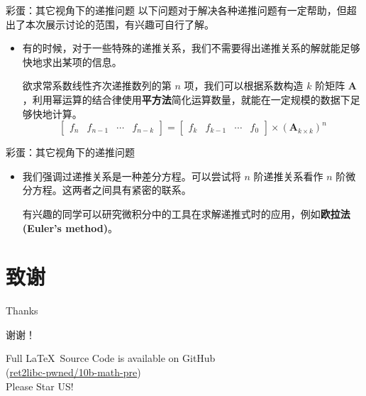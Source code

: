 \documentclass{beamer}
\begin{document}
\begin{frame}{彩蛋：其它视角下的递推问题}
    以下问题对于解决各种递推问题有一定帮助，但超出了本次展示讨论的范围，有兴趣可自行了解。
    \pause
    \begin{itemize}
        \item   有的时候，对于一些特殊的递推关系，我们不需要得出递推关系的解就能足够快地求出某项的信息。
                \begin{example}
                    欲求常系数线性齐次递推数列的第 $n$ 项，我们可以根据系数构造 $k$ 阶矩阵 $\boldsymbol A$，利用幂运算的结合律使用\textbf{平方法}简化运算数量，就能在一定规模的数据下足够快地计算。
                    \begin{displaymath}
                        \begin{bmatrix}
                            f_n & f_{n-1} & \cdots & f_{n-k}
                        \end{bmatrix} = \begin{bmatrix}
                            f_k & f_{k-1} & \cdots & f_{0}
                        \end{bmatrix} \times (\boldsymbol{A}_{k\times k})^n
                    \end{displaymath}
                \end{example}
    \end{itemize}
\end{frame}

\begin{frame}{彩蛋：其它视角下的递推问题}
    \begin{itemize}
        \item   我们强调过递推关系是一种差分方程。可以尝试将 $n$ 阶递推关系看作 $n$ 阶微分方程。这两者之间具有紧密的联系。
        
                有兴趣的同学可以研究微积分中的工具在求解递推式时的应用，例如\textbf{欧拉法 (Euler's method)}。 
    \end{itemize}
\end{frame}

\section{致谢}

\begin{frame}{Thanks}
    \begin{center}
        {\Huge{谢谢！}}
    \end{center}
    \begin{center}
        Full \LaTeX\ Source Code is available on GitHub \\ (\href{https://github.com/ret2libc-pwned/10b-math-pre/}{ret2libc-pwned/10b-math-pre})\\ Please Star US!
    \end{center}
\end{frame}
\end{document}
